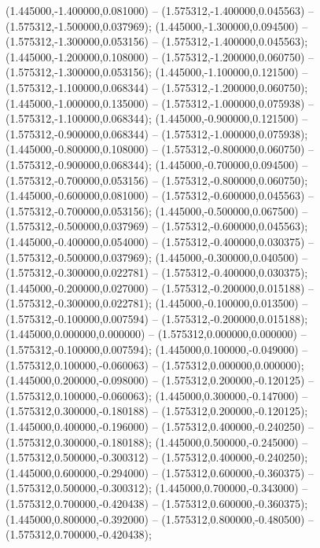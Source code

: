  (1.445000,-1.400000,0.081000) -- (1.575312,-1.400000,0.045563) -- (1.575312,-1.500000,0.037969);
 (1.445000,-1.300000,0.094500) -- (1.575312,-1.300000,0.053156) -- (1.575312,-1.400000,0.045563);
 (1.445000,-1.200000,0.108000) -- (1.575312,-1.200000,0.060750) -- (1.575312,-1.300000,0.053156);
 (1.445000,-1.100000,0.121500) -- (1.575312,-1.100000,0.068344) -- (1.575312,-1.200000,0.060750);
 (1.445000,-1.000000,0.135000) -- (1.575312,-1.000000,0.075938) -- (1.575312,-1.100000,0.068344);
 (1.445000,-0.900000,0.121500) -- (1.575312,-0.900000,0.068344) -- (1.575312,-1.000000,0.075938);
 (1.445000,-0.800000,0.108000) -- (1.575312,-0.800000,0.060750) -- (1.575312,-0.900000,0.068344);
 (1.445000,-0.700000,0.094500) -- (1.575312,-0.700000,0.053156) -- (1.575312,-0.800000,0.060750);
 (1.445000,-0.600000,0.081000) -- (1.575312,-0.600000,0.045563) -- (1.575312,-0.700000,0.053156);
 (1.445000,-0.500000,0.067500) -- (1.575312,-0.500000,0.037969) -- (1.575312,-0.600000,0.045563);
 (1.445000,-0.400000,0.054000) -- (1.575312,-0.400000,0.030375) -- (1.575312,-0.500000,0.037969);
 (1.445000,-0.300000,0.040500) -- (1.575312,-0.300000,0.022781) -- (1.575312,-0.400000,0.030375);
 (1.445000,-0.200000,0.027000) -- (1.575312,-0.200000,0.015188) -- (1.575312,-0.300000,0.022781);
 (1.445000,-0.100000,0.013500) -- (1.575312,-0.100000,0.007594) -- (1.575312,-0.200000,0.015188);
 (1.445000,0.000000,0.000000) -- (1.575312,0.000000,0.000000) -- (1.575312,-0.100000,0.007594);
 (1.445000,0.100000,-0.049000) -- (1.575312,0.100000,-0.060063) -- (1.575312,0.000000,0.000000);
 (1.445000,0.200000,-0.098000) -- (1.575312,0.200000,-0.120125) -- (1.575312,0.100000,-0.060063);
 (1.445000,0.300000,-0.147000) -- (1.575312,0.300000,-0.180188) -- (1.575312,0.200000,-0.120125);
 (1.445000,0.400000,-0.196000) -- (1.575312,0.400000,-0.240250) -- (1.575312,0.300000,-0.180188);
 (1.445000,0.500000,-0.245000) -- (1.575312,0.500000,-0.300312) -- (1.575312,0.400000,-0.240250);
 (1.445000,0.600000,-0.294000) -- (1.575312,0.600000,-0.360375) -- (1.575312,0.500000,-0.300312);
 (1.445000,0.700000,-0.343000) -- (1.575312,0.700000,-0.420438) -- (1.575312,0.600000,-0.360375);
 (1.445000,0.800000,-0.392000) -- (1.575312,0.800000,-0.480500) -- (1.575312,0.700000,-0.420438);
